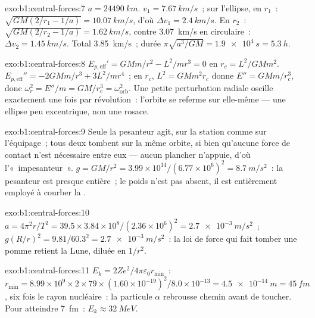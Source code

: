 \begin{solution}{exo:b1:central-forces:7}
$a = \qty{24490}{km}$. $v_1 = \qty{7.67}{km/s}$~; sur l'ellipse, en $r_1$~:
$\sqrt{GM(2/r_1 - 1/a)} = \qty{10.07}{km/s}$, d'où $\Delta v_1 = \qty{2.4}{km/s}$.
En $r_2$~: $\sqrt{GM(2/r_2 - 1/a)} = \qty{1.62}{km/s}$, contre
\qty{3.07}{km/s} en circulaire~: $\Delta v_2 = \qty{1.45}{km/s}$. Total
\qty{3.85}{km/s}~; durée $\pi\sqrt{a^3/GM} = \qty{1.9e4}{s} = \qty{5.3}{h}$.
\end{solution}

\begin{solution}{exo:b1:central-forces:8}
$E_{p,\mathrm{eff}}' = GMm/r^2 - L^2/mr^3 = 0$ en $r_c = L^2/GMm^2$.
$E_{p,\mathrm{eff}}'' = -2GMm/r^3 + 3L^2/mr^4$~; en $r_c$, $L^2 = GMm^2r_c$
donne $E'' = GMm/r_c^3$, donc $\omega_r^2 = E''/m = GM/r_c^3 = \omega_{\text{orb}}^2$.
Une petite perturbation radiale oscille exactement une fois par
révolution~: l'orbite se referme sur elle-même --- une ellipse peu
excentrique, non une rosace.
\end{solution}

\begin{solution}{exo:b1:central-forces:9}
Seule la pesanteur agit, sur la station comme sur l'équipage~; tous deux
tombent sur la même orbite, si bien qu'aucune force de contact n'est
nécessaire entre eux --- aucun plancher n'appuie, d'où l'«~impesanteur~».
$g = GM/r^2 = 3.99\times10^{14}/(6.77\times10^6)^2
= \qty{8.7}{m/s^2}$~: la pesanteur est presque entière~; le poids n'est
pas absent, il est entièrement employé à courber la .
\end{solution}

\begin{solution}{exo:b1:central-forces:10}
$a = 4\pi^2r/T^2 = 39.5 \times 3.84\times10^8/(2.36\times10^6)^2 =
\qty{2.7e-3}{m/s^2}$~; $g(R/r)^2 = 9.81/60.3^2 = \qty{2.7e-3}{m/s^2}$~: la
loi de force qui fait tomber une pomme retient la Lune, diluée en $1/r^2$.
\end{solution}

\begin{solution}{exo:b1:central-forces:11}
$E_k = 2Ze^2/4\pi\varepsilon_0r_{\min}$~: $r_{\min} = 8.99\times10^9 \times 2 \times 79
\times (1.60\times10^{-19})^2/8.0\times10^{-13} = \qty{4.5e-14}{m} = \qty{45}{fm}$,
six fois le rayon nucléaire~: la particule $\alpha$ rebrousse chemin
avant de toucher. Pour atteindre \qty{7}{fm}~: $E_k \approx \qty{32}{MeV}$.
\end{solution}

